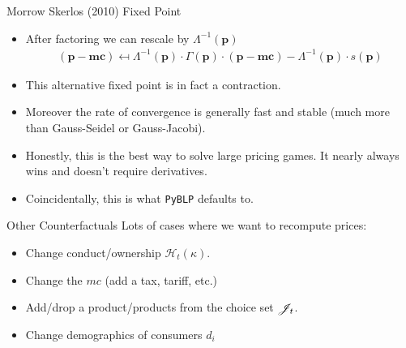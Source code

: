 \documentclass[aspectratio=169,10pt]{beamer}
\begin{document}
\begin{frame}{Morrow Skerlos (2010) Fixed Point}
\begin{itemize}
\item After factoring we can rescale by $\Lambda^{-1} (\symbf{p})$
\begin{align*}
(\symbf{p}-\symbf{mc} ) \mapsfrom \Lambda^{-1}(\symbf{p}) \cdot \Gamma(\symbf{p})\cdot(\symbf{p}- \symbf{mc}) - \Lambda^{-1}(\symbf{p})\cdot s(\symbf{p})
\end{align*}
\item This alternative fixed point is in fact a contraction.
\item Moreover the rate of convergence is generally fast and stable (much more than Gauss-Seidel or Gauss-Jacobi).
\item Honestly, this is the best way to solve large pricing games. It nearly always wins and doesn't require derivatives.
\item Coincidentally, this is what \texttt{PyBLP} defaults to.
\end{itemize}
\end{frame}



\begin{frame}{Other Counterfactuals}
Lots of cases where we want to recompute prices:
\begin{itemize}
\item Change conduct/ownership $\mathcal{H}_t(\kappa)$.
\item Change the $mc$ (add a tax, tariff, etc.)
\item Add/drop a product/products from the choice set $\mathscr{J}_t$.
\item Change demographics of consumers $d_i$
\end{itemize}
\end{frame}
\end{document}
